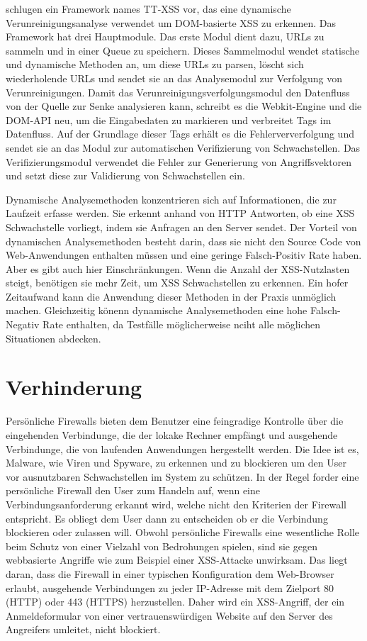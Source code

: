 \textcite[5]{wang2018} schlugen ein Framework names TT-XSS vor, das eine dynamische Verunreinigungsanalyse verwendet um DOM-basierte XSS zu erkennen. Das Framework hat drei Hauptmodule. Das erste Modul dient dazu, URLs zu sammeln und in einer Queue zu speichern. Dieses Sammelmodul wendet statische und dynamische Methoden an, um diese URLs zu parsen, löscht sich wiederholende URLs und sendet sie an das Analysemodul zur Verfolgung von Verunreinigungen. Damit das Verunreinigungsverfolgungsmodul den Datenfluss von der Quelle zur Senke analysieren kann, schreibt es die Webkit-Engine und die DOM-API neu, um die Eingabedaten zu markieren und verbreitet Tags im Datenfluss. Auf der Grundlage dieser Tags erhält es die Fehlerververfolgung und sendet sie an das Modul zur automatischen Verifizierung von Schwachstellen. Das Verifizierungsmodul verwendet die Fehler zur Generierung von Angriffsvektoren und setzt diese zur Validierung von Schwachstellen ein.

Dynamische Analysemethoden konzentrieren sich auf Informationen, die zur Laufzeit erfasse werden. Sie erkennt anhand von HTTP Antworten, ob eine XSS Schwachstelle vorliegt, indem sie Anfragen an den Server sendet. Der Vorteil von dynamischen Analysemethoden besteht darin, dass sie nicht den Source Code von Web-Anwendungen enthalten müssen und eine geringe Falsch-Positiv Rate haben. Aber es gibt auch hier Einschränkungen. Wenn die Anzahl der XSS-Nutzlasten steigt, benötigen sie mehr Zeit, um XSS Schwachstellen zu erkennen. Ein hofer Zeitaufwand kann die Anwendung dieser Methoden in der Praxis unmöglich machen. Gleichzeitig könenn dynamische Analysemethoden eine hohe Falsch-Negativ Rate enthalten, da Testfälle möglicherweise nciht alle möglichen Situationen abdecken. \autocite[182011]{liu2019}

\section{Verhinderung}
\label{section:Prevention}

Persönliche Firewalls bieten dem Benutzer eine feingradige Kontrolle über die eingehenden Verbindunge, die der lokake Rechner empfängt und ausgehende Verbindunge, die von laufenden Anwendungen hergestellt werden.
Die Idee ist es, Malware, wie Viren und Spyware, zu erkennen und zu blockieren um den User vor ausnutzbaren Schwachstellen im System zu schützen.
In der Regel forder eine persönliche Firewall den User zum Handeln auf, wenn eine Verbindungsanforderung erkannt wird, welche nicht den Kriterien der Firewall entspricht. Es obliegt dem User dann zu entscheiden ob er die Verbindung blockieren oder zulassen will.
Obwohl persönliche Firewalls eine wesentliche Rolle beim Schutz von einer Vielzahl von Bedrohungen spielen, sind sie gegen webbasierte Angriffe wie zum Beispiel einer XSS-Attacke unwirksam. Das liegt daran, dass die Firewall in einer typischen Konfiguration dem Web-Browser erlaubt, ausgehende Verbindungen zu jeder IP-Adresse mit dem Zielport 80 (HTTP) oder 443 (HTTPS) herzustellen. Daher wird ein XSS-Angriff, der ein Anmeldeformular von einer vertrauenswürdigen Website auf den Server des Angreifers umleitet, nicht blockiert. \autocite[332]{kirda2006}

